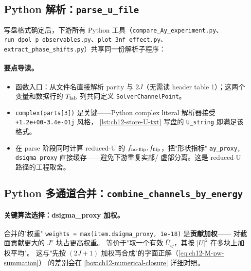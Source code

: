 \subsection{Python 解析：\texttt{parse\_u\_file}}
\label{subsec:ch12-parse-py}

写盘格式确定后，下游所有 Python 工具（\texttt{compare\_Ay\_experiment.py}、
\texttt{run\_dpol\_p\_observables.py}、\texttt{plot\_3nf\_effect.py}、
\texttt{extract\_phase\_shifts.py}）共享同一份解析子程序：



\paragraph{要点导读。}
\begin{itemize}
  \item 函数入口：从文件名直接解析 parity 与 \(2J\)（无需读 header
        table 1）；这两个变量和数据行的 \({T_{\text{lab}}}\) 列共同定义 \texttt{SolverChannelPoint}。
  \item \texttt{complex(parts[3])} 是关键——Python
        complex literal 解析器接受 \texttt{+1.2e+00-3.4e-01j} 风格，
        \cref{lst:ch12-store-U-txt} 写盘的 \texttt{U\_string}
        即满足该格式。
  \item 在 parse 阶段同时计算 reduced-U 的
        \(f_{\rm no\text{-}flip}, f_{\rm flip}\)，把"形状指标"
        \texttt{ay\_proxy, dsigma\_proxy} 直接缓存——避免下游重复实部/
        虚部分离。这是 reduced-U 路径的工程取舍。
\end{itemize}

\subsection{Python 多通道合并：\texttt{combine\_channels\_by\_energy}}
\label{subsec:ch12-combine-py}



\paragraph{关键算法选择：dsigma\_proxy 加权。}
合并的"权重" \texttt{weights = max(item.dsigma\_proxy, 1e-18)} 是\textbf{贡献加权}——
对截面贡献更大的 \(J^\pi\) 块占更高权重。
等价于"取一个有效 \(\bar U_{ij}\)，其按 \(|U|^2\) 在多块上加权平均"。
这与"先按 \((2J+1)\) 加权再合成"的字面正解（\cref{eq:ch12-M-pw-summation}）
的差别会在 \cref{box:ch12-numerical-closure} 详细对照。

